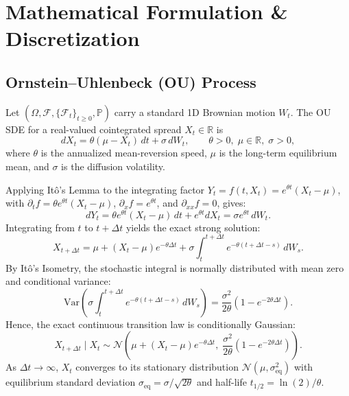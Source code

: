 \documentclass[10pt,twocolumn]{article}
\begin{document}
\section{Mathematical Formulation \& Discretization}

\subsection{Ornstein--Uhlenbeck (OU) Process}
Let $(\Omega,\mathcal{F},\{\mathcal{F}_t\}_{t\ge 0},\mathbb{P})$ carry a standard 1D Brownian motion $W_t$. The OU SDE for a real-valued cointegrated spread $X_t \in \mathbb{R}$ is
\begin{equation}
dX_t = \theta(\mu - X_t)\,dt + \sigma\,dW_t, \qquad \theta > 0,\; \mu \in \mathbb{R},\; \sigma > 0,
\label{eq:ou_sde}
\end{equation}
where $\theta$ is the annualized mean-reversion speed, $\mu$ is the long-term equilibrium mean, and $\sigma$ is the diffusion volatility. 

Applying It\^o's Lemma to the integrating factor $Y_t = f(t, X_t) = e^{\theta t}(X_t - \mu)$, with $\partial_t f = \theta e^{\theta t}(X_t-\mu)$, $\partial_x f = e^{\theta t}$, and $\partial_{xx} f = 0$, gives:
\begin{equation}
dY_t = \theta e^{\theta t}(X_t-\mu)\,dt + e^{\theta t}dX_t = \sigma e^{\theta t}\,dW_t.
\end{equation}
Integrating from $t$ to $t+\Delta t$ yields the exact strong solution:
\begin{equation}
X_{t+\Delta t} = \mu + (X_t - \mu)e^{-\theta \Delta t} + \sigma \int_t^{t+\Delta t} e^{-\theta(t+\Delta t - s)}\,dW_s.
\label{eq:ou_sol}
\end{equation}
By It\^o's Isometry, the stochastic integral is normally distributed with mean zero and conditional variance:
\begin{equation}
\mathrm{Var}\!\left(\sigma \int_t^{t+\Delta t} e^{-\theta(t+\Delta t - s)}\,dW_s\right) = \frac{\sigma^2}{2\theta}\left(1 - e^{-2\theta\Delta t}\right).
\end{equation}
Hence, the exact continuous transition law is conditionally Gaussian:
\begin{equation}
X_{t+\Delta t} \mid X_t \sim \mathcal{N}\!\left(\mu + (X_t - \mu)e^{-\theta\Delta t},\; \frac{\sigma^2}{2\theta}\!\left(1 - e^{-2\theta\Delta t}\right)\right).
\label{eq:ou_trans}
\end{equation}
As $\Delta t \to \infty$, $X_t$ converges to its stationary distribution $\mathcal{N}(\mu, \sigma_{\mathrm{eq}}^2)$ with equilibrium standard deviation $\sigma_{\mathrm{eq}} = \sigma/\sqrt{2\theta}$ and half-life $t_{1/2} = \ln(2)/\theta$.
\end{document}
